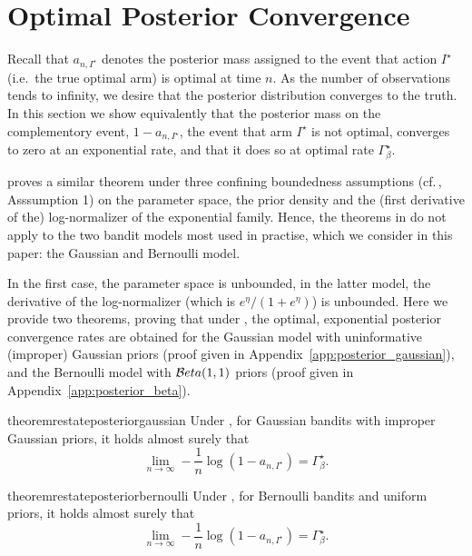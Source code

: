 \section{Optimal Posterior Convergence
}\label{sec:bayesian}

Recall that $a_{n, I^\star}$ denotes the posterior mass assigned to the event that action $I^\star$ (i.e.\ the true optimal arm) is optimal at time $n$. As the number of observations tends to infinity, we desire that the posterior distribution converges to the truth. In this section we show equivalently that the posterior mass on the complementory event, $1 - a_{n, I^\star}$, the event that arm $I^\star$ is not optimal, converges to zero at an exponential rate, and that it does so at optimal rate $\Gamma_{\beta}^\star$. 

\citet{russo2016ttts} proves a similar theorem under three confining boundedness assumptions (cf.\,\citealt{russo2016ttts}, Asssumption 1) on the parameter space, the prior density and the (first derivative of the) log-normalizer of the exponential family. Hence, the theorems in \cite{russo2016ttts} do not apply to the two bandit models most used in practise, which we consider in this paper: the Gaussian and Bernoulli model. 

In the first case, the parameter space is unbounded, in the latter model, the derivative of the log-normalizer (which is $e^{\eta} / (1 + e^\eta)$) is unbounded. Here we provide two theorems, proving that under \TTTS, the optimal, exponential posterior convergence rates are obtained for the Gaussian model with uninformative (improper) Gaussian priors (proof given in Appendix~\ref{app:posterior_gaussian}), and the Bernoulli model with $\mathcal{B} eta(1,1)$ priors (proof given in Appendix~\ref{app:posterior_beta}).

\begin{restatable}{theorem}{restateposteriorgaussian}\label{thm:posterior_gaussian}
    Under \TTTS, for Gaussian bandits with improper Gaussian priors, it holds almost surely that 
    \[
        \lim_{n\rightarrow{\infty}} -\frac{1}{n}\log(1-a_{n,I^\star}) = \Gamma_{\beta}^\star.
    \]
\end{restatable}

\begin{restatable}{theorem}{restateposteriorbernoulli}\label{thm:posterior_bernoulli}
	Under \TTTS, for Bernoulli bandits and uniform priors, it holds almost surely that
	\[
	\lim_{n\rightarrow{\infty}} -\frac{1}{n}\log(1-a_{n,I^\star}) = \Gamma_{\beta}^\star.
	\]
\end{restatable}
